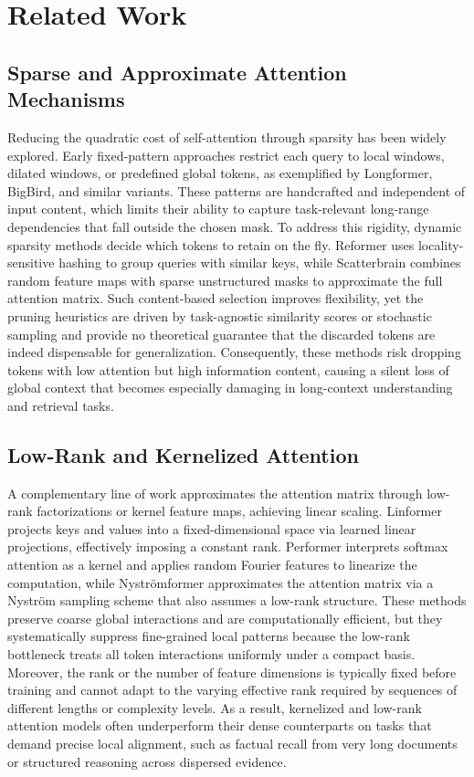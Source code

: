 \documentclass{article}
\begin{document}
\section{Related Work}
\subsection{Sparse and Approximate Attention Mechanisms}

Reducing the quadratic cost of self-attention through sparsity has been widely explored. Early fixed-pattern approaches restrict each query to local windows, dilated windows, or predefined global tokens, as exemplified by Longformer, BigBird, and similar variants. These patterns are handcrafted and independent of input content, which limits their ability to capture task-relevant long-range dependencies that fall outside the chosen mask. To address this rigidity, dynamic sparsity methods decide which tokens to retain on the fly. Reformer uses locality-sensitive hashing to group queries with similar keys, while Scatterbrain combines random feature maps with sparse unstructured masks to approximate the full attention matrix. Such content-based selection improves flexibility, yet the pruning heuristics are driven by task-agnostic similarity scores or stochastic sampling and provide no theoretical guarantee that the discarded tokens are indeed dispensable for generalization. Consequently, these methods risk dropping tokens with low attention but high information content, causing a silent loss of global context that becomes especially damaging in long-context understanding and retrieval tasks.

\subsection{Low-Rank and Kernelized Attention}

A complementary line of work approximates the attention matrix through low-rank factorizations or kernel feature maps, achieving linear scaling. Linformer projects keys and values into a fixed-dimensional space via learned linear projections, effectively imposing a constant rank. Performer interprets softmax attention as a kernel and applies random Fourier features to linearize the computation, while Nystr\"omformer approximates the attention matrix via a Nystr\"om sampling scheme that also assumes a low-rank structure. These methods preserve coarse global interactions and are computationally efficient, but they systematically suppress fine-grained local patterns because the low-rank bottleneck treats all token interactions uniformly under a compact basis. Moreover, the rank or the number of feature dimensions is typically fixed before training and cannot adapt to the varying effective rank required by sequences of different lengths or complexity levels. As a result, kernelized and low-rank attention models often underperform their dense counterparts on tasks that demand precise local alignment, such as factual recall from very long documents or structured reasoning across dispersed evidence.
\end{document}
